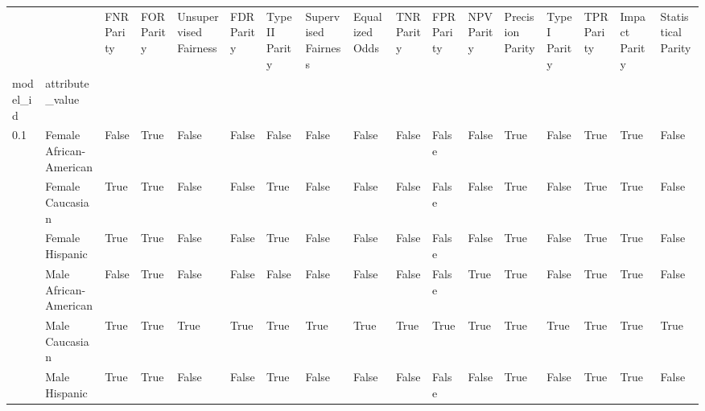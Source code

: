 \begin{tabular}{lllllllllllllllll}
\toprule
    &               &  FNR Parity &  FOR Parity &  Unsupervised Fairness &  FDR Parity &  TypeII Parity &  Supervised Fairness &  Equalized Odds &  TNR Parity &  FPR Parity &  NPV Parity &  Precision Parity &  TypeI Parity &  TPR Parity &  Impact Parity &  Statistical Parity \\
model\_id & attribute\_value &             &             &                        &             &                &                      &                 &             &             &             &                   &               &             &                &                     \\
\midrule
0.1 & Female African-American &       False &        True &                  False &       False &          False &                False &           False &       False &       False &       False &              True &         False &        True &           True &               False \\
    & Female Caucasian &        True &        True &                  False &       False &           True &                False &           False &       False &       False &       False &              True &         False &        True &           True &               False \\
    & Female Hispanic &        True &        True &                  False &       False &           True &                False &           False &       False &       False &       False &              True &         False &        True &           True &               False \\
    & Male African-American &       False &        True &                  False &       False &          False &                False &           False &       False &       False &        True &              True &         False &        True &           True &               False \\
    & Male Caucasian &        True &        True &                   True &        True &           True &                 True &            True &        True &        True &        True &              True &          True &        True &           True &                True \\
    & Male Hispanic &        True &        True &                  False &       False &           True &                False &           False &       False &       False &       False &              True &         False &        True &           True &               False \\

\end{tabular}
